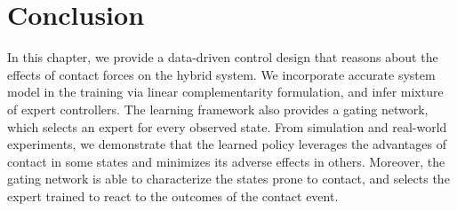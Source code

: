 \section{Conclusion}
\label{sec:moe_conclusion}

In this chapter, we provide a data-driven control design that reasons about the
effects of contact forces on the hybrid system.
%
We incorporate accurate system model in the training via linear complementarity
formulation, and infer mixture of expert controllers.
%
The learning framework also provides a gating network, which selects an expert
for every observed state.
%
From simulation and real-world experiments, we demonstrate that the learned
policy leverages the advantages of contact in some states and minimizes its
adverse effects in others.
%
Moreover, the gating network is able to characterize the states prone to
contact, and selects the expert trained to react to the outcomes of the contact
event.~

